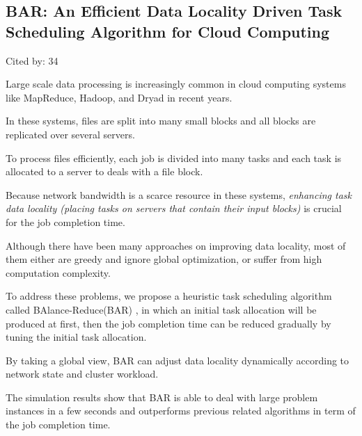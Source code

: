 \documentclass[a4paper,11pt]{article}
\begin{document}
\subsection*{BAR: An Efficient Data Locality Driven Task Scheduling Algorithm for Cloud Computing}
{\color{cyan} {\color{magenta} Cited by: 34}

Large scale data processing is increasingly common in cloud computing systems 
like MapReduce, Hadoop, and Dryad 
in recent years. 

In these systems, 
files are split into many small blocks and 
all blocks are replicated over several servers. 

To process files efficiently, 
each job is divided into many tasks and 
each task is allocated to a server to deals with a file block. 

Because network bandwidth is a scarce resource in these systems, 
{\em enhancing task data locality (placing tasks on servers that contain their input blocks)}
is crucial 
for the job completion time. 

Although there have been many approaches on improving data locality, 
most of them 
either are greedy and ignore global optimization, 
or suffer from high computation complexity. 

To address these problems, 
we propose 
{\color{black} a heuristic task scheduling algorithm called BAlance-Reduce(BAR) \cite{bar}}, 
in which 
an initial task allocation will be produced at first, then 
the job completion time can be reduced gradually by tuning the initial task allocation. 

By taking a global view, 
BAR can adjust data locality dynamically 
according to network state and cluster workload. 

The simulation results show that BAR 
is able to 
deal with large problem instances in a few seconds and 
outperforms previous related algorithms in term of the job completion time.	

}
\end{document}
